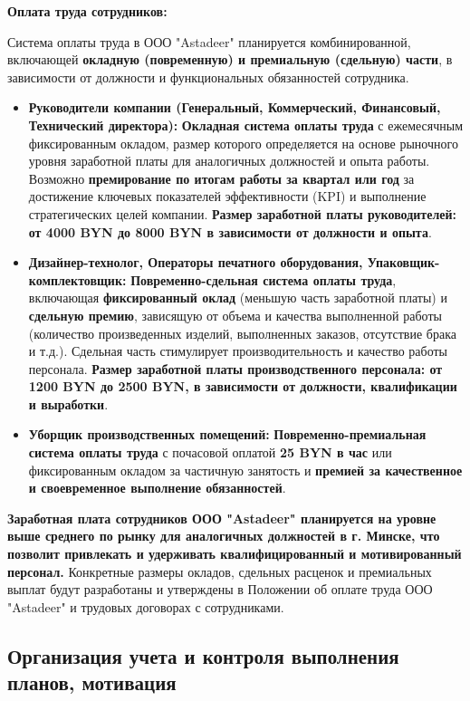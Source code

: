 \textbf{Оплата труда сотрудников:}

Система оплаты труда в ООО "Astadeer" планируется комбинированной, включающей \textbf{окладную (повременную) и премиальную (сдельную) части}, в зависимости от должности и функциональных обязанностей сотрудника.

\begin{itemize}
    \item \textbf{Руководители компании (Генеральный, Коммерческий, Финансовый, Технический директора):}  \textbf{Окладная система оплаты труда} с ежемесячным фиксированным окладом, размер которого определяется на основе рыночного уровня заработной платы для аналогичных должностей и опыта работы.  Возможно \textbf{премирование по итогам работы за квартал или год} за достижение ключевых показателей эффективности (KPI) и выполнение стратегических целей компании.  \textbf{Размер заработной платы руководителей: от 4000 BYN до 8000 BYN в зависимости от должности и опыта}.
    \item \textbf{Дизайнер-технолог, Операторы печатного оборудования, Упаковщик-комплектовщик:}  \textbf{Повременно-сдельная система оплаты труда}, включающая \textbf{фиксированный оклад} (меньшую часть заработной платы) и \textbf{сдельную премию}, зависящую от объема и качества выполненной работы (количество произведенных изделий, выполненных заказов, отсутствие брака и т.д.).  Сдельная часть стимулирует производительность и качество работы персонала.  \textbf{Размер заработной платы производственного персонала: от 1200 BYN до 2500 BYN, в зависимости от должности, квалификации и выработки}.
    \item \textbf{Уборщик производственных помещений:}  \textbf{Повременно-премиальная система оплаты труда} с почасовой оплатой \textbf{25 BYN в час} или фиксированным окладом за частичную занятость и \textbf{премией за качественное и своевременное выполнение обязанностей}.
\end{itemize}

\textbf{Заработная плата сотрудников ООО "Astadeer" планируется на уровне \textbf{выше среднего по рынку для аналогичных должностей в г. Минске}, что позволит привлекать и удерживать квалифицированный и мотивированный персонал.}  Конкретные размеры окладов, сдельных расценок и премиальных выплат будут разработаны и утверждены в Положении об оплате труда ООО "Astadeer" и трудовых договорах с сотрудниками.

\subsection{Организация учета и контроля выполнения планов, мотивация}

